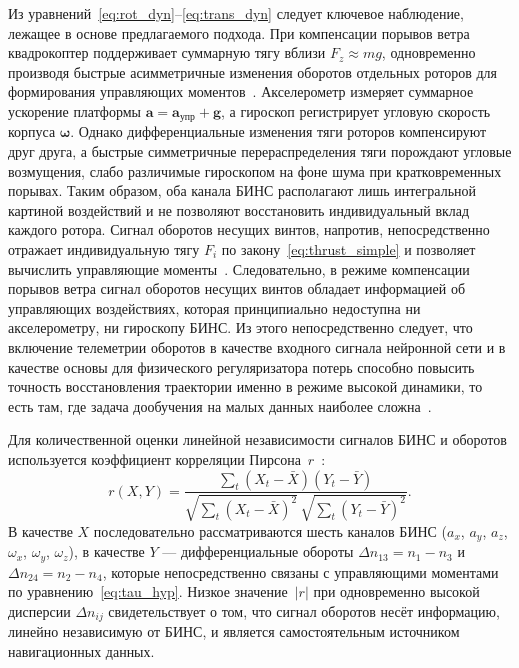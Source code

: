 Из уравнений~\eqref{eq:rot_dyn}--\eqref{eq:trans_dyn} следует ключевое
наблюдение, лежащее в основе предлагаемого подхода.
При компенсации порывов ветра квадрокоптер поддерживает суммарную тягу вблизи
$F_z \approx mg$, одновременно производя быстрые асимметричные изменения
оборотов отдельных роторов для формирования управляющих моментов~\cite{Faessler2018}.
Акселерометр измеряет суммарное ускорение платформы
$\mathbf{a} = \mathbf{a}_\text{упр} + \mathbf{g}$, а гироскоп регистрирует угловую скорость корпуса $\boldsymbol{\omega}$.
Однако дифференциальные изменения тяги роторов компенсируют друг друга, а быстрые симметричные перераспределения тяги порождают угловые
возмущения, слабо различимые гироскопом на фоне шума при кратковременных порывах.
Таким образом, оба канала БИНС располагают лишь интегральной картиной воздействий
и не позволяют восстановить индивидуальный вклад каждого ротора.
Сигнал оборотов несущих винтов, напротив, непосредственно отражает
индивидуальную тягу $F_i$ по закону~\eqref{eq:thrust_simple} и позволяет вычислить управляющие моменты~\cite{Lu2022rpm}.
Следовательно, в режиме компенсации порывов ветра сигнал оборотов несущих
винтов обладает информацией об управляющих воздействиях, которая принципиально
недоступна ни акселерометру, ни гироскопу БИНС.
Из этого непосредственно следует, что включение телеметрии оборотов в качестве
входного сигнала нейронной сети и в качестве основы для физического
регуляризатора потерь способно повысить точность восстановления траектории
именно в режиме высокой динамики, то есть там, где задача дообучения на малых
данных наиболее сложна~\cite{Ilyasov2023pinn}.

Для количественной оценки линейной независимости сигналов БИНС и оборотов
используется коэффициент корреляции Пирсона~$r$~\cite{Kobzar2006}:
\begin{equation}
	r(X, Y) = \frac{\sum_t (X_t - \bar{X})(Y_t - \bar{Y})}
	{\sqrt{\sum_t (X_t - \bar{X})^2}\,
		\sqrt{\sum_t (Y_t - \bar{Y})^2}}.
	\label{eq:pearson}
\end{equation}
В качестве $X$ последовательно рассматриваются шесть каналов БИНС
($a_x$, $a_y$, $a_z$, $\omega_x$, $\omega_y$, $\omega_z$),
в качестве $Y$ --- дифференциальные обороты
$\Delta n_{13} = n_1 - n_3$ и $\Delta n_{24} = n_2 - n_4$,
которые непосредственно связаны с управляющими моментами по
уравнению~\eqref{eq:tau_hyp}.
Низкое значение~$|r|$ при одновременно высокой дисперсии $\Delta n_{ij}$
свидетельствует о том, что сигнал оборотов несёт информацию, линейно
независимую от БИНС, и является самостоятельным источником навигационных данных.

